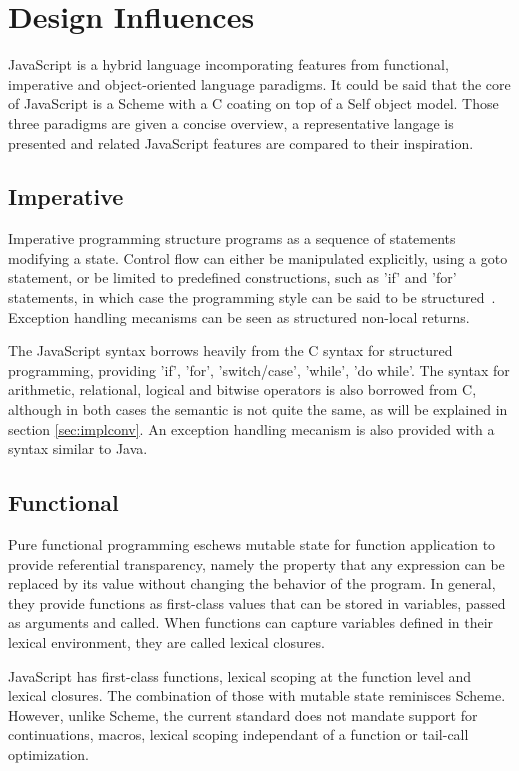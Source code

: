 \section{Design Influences}

JavaScript is a hybrid language incomporating features from functional, imperative and object-oriented language paradigms. It could be said that the core of JavaScript is a Scheme with a C coating on top of a Self object model. Those three paradigms are given a concise overview, a representative langage is presented and related JavaScript features are compared to their inspiration.

\subsection{Imperative}

Imperative programming structure programs as a sequence of statements modifying a state. Control flow can either be manipulated explicitly, using a goto statement, or be limited to predefined constructions, such as 'if' and 'for' statements, in which case the programming style can be said to be structured~\cite{Dijkstra:1968}. Exception handling mecanisms can be seen as structured non-local returns.

The JavaScript syntax borrows heavily from the C syntax for structured programming, providing 'if', 'for', 'switch/case', 'while', 'do while'. The syntax for arithmetic, relational, logical and bitwise operators is also borrowed from C, although in both cases the semantic is not quite the same, as will be explained in section \ref{sec:implconv}. An exception handling mecanism is also provided with a syntax similar to Java.

\subsection{Functional}

Pure functional programming eschews mutable state for function application to provide referential transparency, namely the property that any expression can be replaced by its value without changing the behavior of the program. In general, they provide functions as first-class values that can be stored in variables, passed as arguments and called. When functions can capture variables defined in their lexical environment, they are called lexical closures.

JavaScript has first-class functions, lexical scoping at the function level and lexical closures. The combination of those with mutable state reminisces Scheme. However, unlike Scheme, the current standard does not mandate support for continuations, macros, lexical scoping independant of a function or tail-call optimization.

